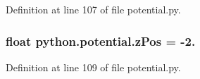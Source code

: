 Definition at line 107 of file potential.\-py.

\hypertarget{namespacepython_1_1potential_a4e432f1a62f7b47435c40353029d9547}{
\subsubsection[{z\-Pos}]{\setlength{\rightskip}{0pt plus 5cm}float python.\-potential.\-z\-Pos = -\/2.}}\label{namespacepython_1_1potential_a4e432f1a62f7b47435c40353029d9547}


Definition at line 109 of file potential.\-py.

